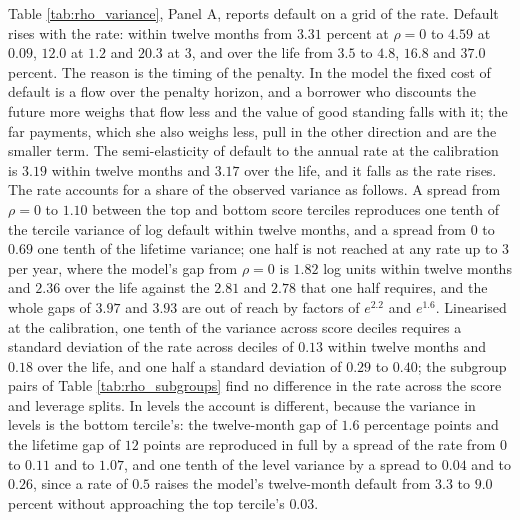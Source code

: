 \documentclass[12pt,english]{article}
\begin{document}
Table \ref{tab:rho_variance}, Panel A, reports default on a grid of the rate. Default rises with the rate: within twelve months from $3.31$ percent at $\rho = 0$ to $4.59$ at $0.09$, $12.0$ at $1.2$ and $20.3$ at $3$, and over the life from $3.5$ to $4.8$, $16.8$ and $37.0$ percent. The reason is the timing of the penalty. In the model the fixed cost of default is a flow over the penalty horizon, and a borrower who discounts the future more weighs that flow less and the value of good standing falls with it; the far payments, which she also weighs less, pull in the other direction and are the smaller term. The semi-elasticity of default to the annual rate at the calibration is $3.19$ within twelve months and $3.17$ over the life, and it falls as the rate rises. The rate accounts for a share of the observed variance as follows. A spread from $\rho = 0$ to $1.10$ between the top and bottom score terciles reproduces one tenth of the tercile variance of log default within twelve months, and a spread from $0$ to $0.69$ one tenth of the lifetime variance; one half is not reached at any rate up to $3$ per year, where the model's gap from $\rho = 0$ is $1.82$ log units within twelve months and $2.36$ over the life against the $2.81$ and $2.78$ that one half requires, and the whole gaps of $3.97$ and $3.93$ are out of reach by factors of $e^{2.2}$ and $e^{1.6}$. Linearised at the calibration, one tenth of the variance across score deciles requires a standard deviation of the rate across deciles of $0.13$ within twelve months and $0.18$ over the life, and one half a standard deviation of $0.29$ to $0.40$; the subgroup pairs of Table \ref{tab:rho_subgroups} find no difference in the rate across the score and leverage splits. In levels the account is different, because the variance in levels is the bottom tercile's: the twelve-month gap of $1.6$ percentage points and the lifetime gap of $12$ points are reproduced in full by a spread of the rate from $0$ to $0.11$ and to $1.07$, and one tenth of the level variance by a spread to $0.04$ and to $0.26$, since a rate of $0.5$ raises the model's twelve-month default from $3.3$ to $9.0$ percent without approaching the top tercile's $0.03$.
\end{document}

